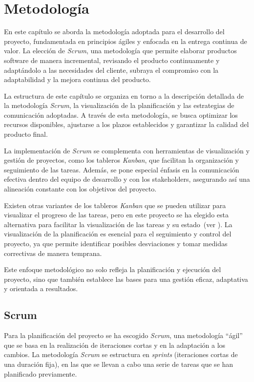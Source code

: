\section{Metodología}\label{sec:metodología}
En este capítulo se aborda la metodología adoptada para el desarrollo del
proyecto, fundamentada en principios ágiles y enfocada en la entrega continua de
valor. La elección de \textit{Scrum}, una metodología que permite elaborar
productos software de manera incremental, revisando el producto continuamente y
adaptándolo a las necesidades del cliente, subraya el compromiso con la
adaptabilidad y la mejora continua del producto.

La estructura de este capítulo se organiza en torno a la descripción detallada
de la metodología \textit{Scrum}, la visualización de la planificación y las
estrategias de comunicación adoptadas. A través de esta metodología, se busca
optimizar los recursos disponibles, ajustarse a los plazos establecidos y
garantizar la calidad del producto final.

La implementación de \textit{Scrum} se complementa con herramientas de
visualización y gestión de proyectos, como los tableros \textit{Kanban}, que
facilitan la organización y seguimiento de las tareas. Además, se pone especial
énfasis en la comunicación efectiva dentro del equipo de desarrollo y con los
stakeholders, asegurando así una alineación constante con los objetivos del
proyecto.

Existen otras variantes de los tableros \textit{Kanban} que se pueden
utilizar para visualizar el progreso de las tareas, pero en este proyecto se ha
elegido esta alternativa para facilitar la visualización de las tareas y su
estado~(ver ). La visualización de la
planificación es esencial para el seguimiento y control del proyecto, ya que
permite identificar posibles desviaciones y tomar medidas correctivas de manera
temprana.

Este enfoque metodológico no solo refleja la planificación y ejecución del
proyecto, sino que también establece las bases para una gestión eficaz,
adaptativa y orientada a resultados.


\newpage{}
\subsection{Scrum}\label{subsec:scrum}
Para la planificación del proyecto se ha escogido \textit{Scrum}, una
metodología ``ágil'' que se basa en la realización de iteraciones cortas y en la
adaptación a los cambios. La metodología \textit{Scrum} se estructura en
\textit{sprints} (iteraciones cortas de una duración fija), en las que se llevan
a cabo una serie de tareas que se han planificado previamente.

